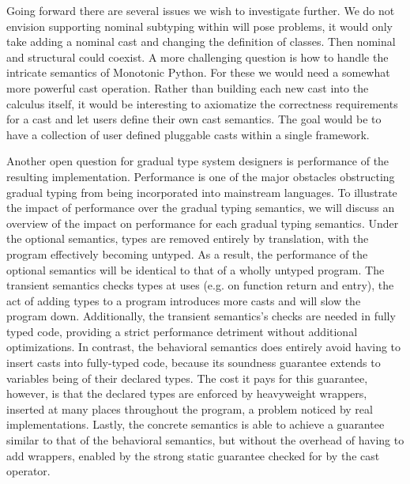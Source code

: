 \documentclass[a4paper,USenglish]{tex/lipics-v2016}
\begin{document}
Going forward there are several issues we wish to investigate further.  We
do not envision supporting nominal subtyping within \kafka will pose
problems, it would only take adding a nominal cast and changing the
definition of classes. Then nominal and structural could coexist. A more
challenging question is how to handle the intricate semantics of Monotonic
Python. For these we would need a somewhat more powerful cast operation.
Rather than building each new cast into the calculus itself, it would be
interesting to axiomatize the correctness requirements for a cast and let
users define their own cast semantics. The goal would be to have a collection
of user defined pluggable casts within a single framework. 

Another open question for gradual type system designers is performance of
the resulting implementation. Performance is one of the major obstacles
obstructing gradual typing from being incorporated into mainstream
languages. To illustrate the impact of performance over the gradual typing
semantics, we will discuss an overview of the impact on performance for each
gradual typing semantics.  Under the optional semantics, types are removed
entirely by translation, with the program effectively becoming untyped. As a
result, the performance of the optional semantics will be identical to that
of a wholly untyped program.  The transient semantics checks types at uses
(e.g. on function return and entry), the act of adding types to a program
introduces more casts and will slow the program down. Additionally, the
transient semantics's checks are needed in fully typed code, providing a
strict performance detriment without additional optimizations.  In contrast,
the behavioral semantics does entirely avoid having to insert casts into
fully-typed code, because its soundness guarantee extends to variables being
of their declared types. The cost it pays for this guarantee, however, is
that the declared types are enforced by heavyweight wrappers, inserted at
many places throughout the program, a problem noticed by real
implementations.  Lastly, the concrete semantics is able to achieve a
guarantee similar to that of the behavioral semantics, but without the
overhead of having to add wrappers, enabled by the strong static guarantee
checked for by the cast operator.



\newpage
\appendix
\end{document}
